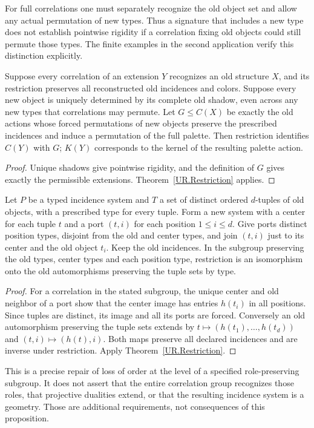For full correlations one must separately recognize the old object set
and allow any actual permutation of new types. Thus a signature that
includes a new type does not establish pointwise rigidity if a correlation
fixing old objects could still permute those types. The finite examples
in the second application verify this distinction explicitly.

\begin{corollary}\label{UR.UniqueShadows}
Suppose every correlation of an extension $Y$ recognizes an old structure
$X$, and its restriction preserves all reconstructed old incidences and
colors. Suppose every new object is uniquely determined by its complete
old shadow, even across any new types that correlations may permute.
Let $G\leq C(X)$ be exactly the old actions whose forced permutations of
new objects preserve the prescribed incidences and induce a permutation
of the full palette. Then restriction identifies $C(Y)$ with $G$; $K(Y)$
corresponds to the kernel of the resulting palette action.
\end{corollary}
\begin{proof}
Unique shadows give pointwise rigidity, and the definition of $G$ gives
exactly the permissible extensions. Theorem~\ref{UR.Restriction} applies.
\end{proof}

\begin{proposition}\label{UR.OrderedShadows}
Let $P$ be a typed incidence system and $T$ a set of distinct ordered
$d$-tuples of old objects, with a prescribed type for every tuple. Form a
new system with a center for each tuple $t$ and a port $(t,i)$ for each
position $1\leq i\leq d$. Give ports distinct position types, disjoint
from the old and center types, and join $(t,i)$ just to its center and the
old object $t_i$. Keep the old incidences. In the subgroup preserving the
old types, center types and each position type, restriction is an
isomorphism onto the old automorphisms preserving the tuple sets by type.
\end{proposition}
\begin{proof}
For a correlation in the stated subgroup, the unique center and old
neighbor of a port show that the center image has entries $h(t_i)$ in
all positions. Since tuples are distinct, its image and all its ports
are forced. Conversely an old automorphism preserving the tuple sets
extends by $t\mapsto(h(t_1),\ldots,h(t_d))$ and $(t,i)\mapsto(h(t),i)$.
Both maps preserve all declared incidences and are inverse under
restriction. Apply Theorem~\ref{UR.Restriction}.
\end{proof}
This is a precise repair of loss of order at the level of a specified
role-preserving subgroup. It does not assert that the entire correlation
group recognizes those roles, that projective dualities extend, or that
the resulting incidence system is a geometry. Those are additional
requirements, not consequences of this proposition.

